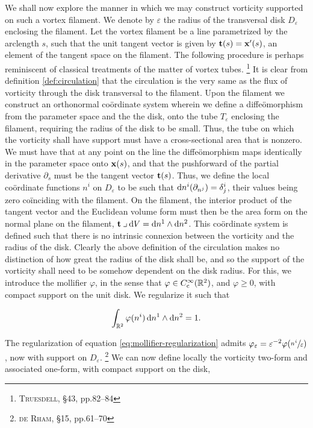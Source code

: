 \noindent
We shall now explore the manner in which we may construct vorticity supported on such a vortex filament.
We denote by $\varepsilon$ the radius of the transversal disk $D_\varepsilon$ enclosing the filament.
Let the vortex filament be a line parametrized by the arclength $s$, such that the unit tangent vector is given by $\mathbf{t}(s) = \mathbf{x}^{\prime}(s)$, an element of the tangent space on the filament.
The following procedure is perhaps reminiscent of classical treatments of the matter of vortex tubes.%
\footnote{%
  \cite{truesdell1954kinematics} \textsc{Truesdell}, \S43, pp.82--84
}
It is clear from definition \ref{def:circulation} that the circulation is the very same as the flux of vorticity through the disk transversal to the filament.
Upon the filament we construct an orthonormal coördinate system wherein we define a diffeömorphism from the parameter space and the the disk, onto the tube $T_{\varepsilon}$ enclosing the filament, requiring the radius of the disk to be small.
Thus, the tube on which the vorticity shall have support must have a cross-sectional area that is nonzero.
We must have that at any point on the line the diffeömorphism maps identically in the parameter space onto $\mathbf{x}(s)$, and that the pushforward of the partial derivative $\partial_s$ must be the tangent vector $\mathbf{t}(s)$.
Thus, we define the local coördinate functions $n^i$ on $D_{\varepsilon}$ to be such that $\mathrm{d} n^i(\partial_{n^j}) = \delta_j^i$, their values being zero coïnciding with the filament.
On the filament, the interior product of the tangent vector and the Euclidean volume form must then be the area form on the normal plane on the filament, $\tvec \iprod \dee V = \dee n^1 \wedge \dee n^2$.
This coördinate system is defined such that there is no intrinsic connexion between the vorticity and the radius of the disk.
Clearly the above definition of the circulation makes no distinction of how great the radius of the disk shall be, and so the support of the vorticity shall need to be somehow dependent on the disk radius.
For this, we introduce the mollifier $\varphi$, in the sense that $\varphi \in C_{\mathrm{c}}^{\infty}(\mathbb{R}^2)$, and $\varphi \geq 0$, with compact support on the unit disk.
We regularize it such that

\begin{equation}\label{eq:mollifier-regularization}
  \int_{\mathbb{R}^2} \varphi(n^i) \, \mathrm{d} n^1 \wedge \mathrm{d} n^2 = 1.
\end{equation}

\noindent
The regularization of equation \eqref{eq:mollifier-regularization} admits $\varphi_\varepsilon = \varepsilon^{-2} \varphi(\sfrac{n^i}{\varepsilon})$, now with support on $D_{\varepsilon}$.%
\footnote{%
  \cite{rham1984differentiable} \textsc{de Rham}, \S15, pp.61--70
}
We can now define locally the vorticity two-form and associated one-form, with compact support on the disk,


